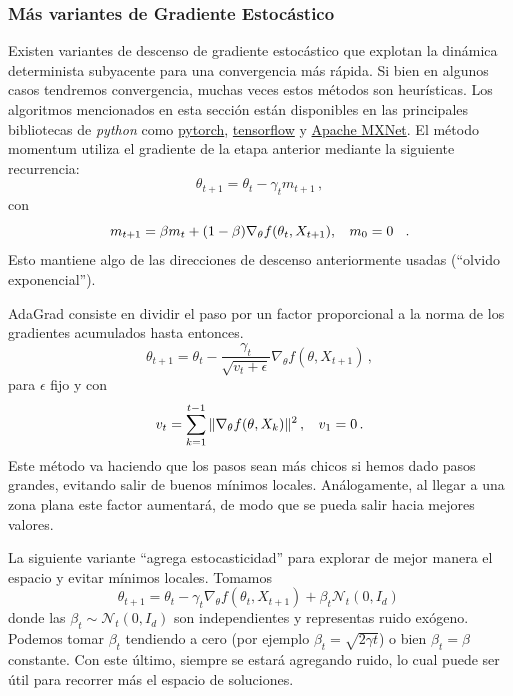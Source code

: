 \subsubsection{Más variantes de Gradiente Estocástico}
Existen variantes de descenso de gradiente estocástico que explotan la dinámica determinista subyacente para una convergencia más rápida. Si bien en algunos casos tendremos convergencia, muchas veces estos métodos son heurísticas. Los algoritmos mencionados en esta sección están disponibles en las principales bibliotecas de \textit{python} como \href{https://pytorch.org/docs/stable/optim.html#algorithms}{pytorch}, \href{https://www.tensorflow.org/api_docs/python/tf/keras/optimizers}{tensorflow} y \href{https://mxnet.apache.org/versions/1.7/api/python/docs/tutorials/packages/optimizer/index.html}{Apache MXNet}.
El método momentum utiliza el gradiente de la etapa anterior mediante la siguiente recurrencia:
$$ \theta_{t+1} = \theta_t - \gamma_t m_{t+1} \,,$$
con
$$ m_{t+1}=\beta m_t+(1-\beta)\nabla_\theta f(\theta_t,X_{t+1}), \hspace{.25cm}\, m_0=0\hspace{.25cm}\, .$$
Esto mantiene algo de las direcciones de descenso anteriormente usadas (``olvido exponencial'').

AdaGrad consiste en dividir el paso por un factor proporcional a la norma de los gradientes acumulados hasta entonces.
$$ \theta_{t+1}=\theta_t-\displaystyle \frac{\gamma_t}{\sqrt{v_t+\epsilon}}\nabla_\theta f(\theta,X_{t+1}) \,,$$
para $\epsilon$ fijo y con
$$ v_t = \displaystyle \sum^{t-1}_{k=1}\|\nabla_\theta f(\theta,X_k)\|^2\,,\hspace{.25cm}\, v_1=0\,.$$
Este método va haciendo que los pasos sean más chicos si hemos dado pasos grandes, evitando salir de buenos mínimos locales. Análogamente, al llegar a una zona plana este factor aumentará, de modo que se pueda salir hacia mejores valores.

La siguiente variante ``agrega estocasticidad'' para explorar de mejor manera el espacio y evitar mínimos locales. Tomamos
$$ \theta_{t+1}=\theta_t-\gamma_t\nabla_\theta f(\theta_t,X_{t+1}) + \beta_t \mathcal{N}_t(0,I_d)\,$$
donde las $ \beta_t\sim \mathcal{N}_t(0,I_d)$ son independientes y representas ruido exógeno. Podemos tomar $\beta_t$ tendiendo a cero (por ejemplo $\beta_t=\sqrt{2\gamma t}$) o bien $\beta_t=\beta$ constante. Con este último, siempre se estará agregando ruido, lo cual puede ser útil para recorrer más el espacio de soluciones.


